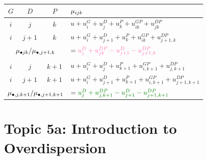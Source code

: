 \documentclass{article}\usepackage[]{graphicx}\usepackage[svgnames]{xcolor}
\let\log\relax%
\begin{document}
\begin{table}[H]
    \centering
    \begin{tabular}{cccl}
        $ G $                                                                   & $ D $                                                                     & $ P $   & $ \log{\mu_{ijk}} $                                             \\
        \midrule
        $ i $                                                                   & $ j $                                                                     & $ k $   & $ u+u_i^G+u_j^D+u_k^P+u_{ik}^{GP}+u_{jk}^{DP} $                 \\
        $ i $                                                                   & $ j+1 $                                                                   & $ k $   & $ u+u_i^G+u_{j+1}^D+u_k^P+u_{ik}^{GP}+u_{j+1,k}^{DP} $          \\
        \midrule
        \multicolumn{3}{c}{$ \log{\mu_{\bullet jk}/\mu_{\bullet,j+1,k}} $}      & $ =\textcolor{HotPink}{u_j^D+u_{jk}^{DP}-u_{j+1}^{D}-u_{j+1,k}^{DP}} $                                                                                \\\\
        \midrule
        $ i $                                                                   & $ j $                                                                     & $ k+1 $ & $ u+u_i^G+u_{j}^D+u_{k+1}^P+u_{i,k+1}^{GP}+u_{j,k+1}^{DP} $     \\
        $ i $                                                                   & $ j+1 $                                                                   & $ k+1 $ & $ u+u_i^G+u_{j+1}^D+u_{k+1}^P+u_{i,k+1}^{GP}+u_{j+1,k+1}^{DP} $ \\
        \midrule
        \multicolumn{3}{c}{$ \log{\mu_{\bullet,j,k+1}/\mu_{\bullet,j+1,k+1}} $} & $ =\textcolor{Green}{u_j^D+u_{j,k+1}^{DP}-u_{j+1}^{D}-u_{j+1,k+1}^{DP}} $
    \end{tabular}
\end{table}

\section*{Topic 5a: Introduction to Overdispersion}
\end{document}
